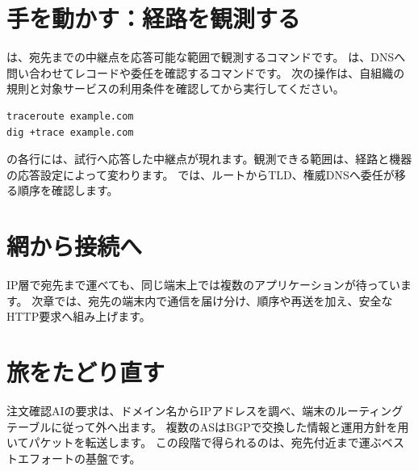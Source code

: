\section{手を動かす：経路を観測する}

は、宛先までの中継点を応答可能な範囲で観測するコマンドです。
は、DNSへ問い合わせてレコードや委任を確認するコマンドです。
次の操作は、自組織の規則と対象サービスの利用条件を確認してから実行してください。

\begin{lstlisting}[language=bash]
traceroute example.com
dig +trace example.com
\end{lstlisting}

の各行には、試行へ応答した中継点が現れます。観測できる範囲は、経路と機器の応答設定によって変わります。
では、ルートからTLD、権威DNSへ委任が移る順序を確認します。

\section{網から接続へ}

IP層で宛先まで運べても、同じ端末上では複数のアプリケーションが待っています。
次章では、宛先の端末内で通信を届け分け、順序や再送を加え、安全なHTTP要求へ組み上げます。

\section{旅をたどり直す}

注文確認AIの要求は、ドメイン名からIPアドレスを調べ、端末のルーティングテーブルに従って外へ出ます。
複数のASはBGPで交換した情報と運用方針を用いてパケットを転送します。
この段階で得られるのは、宛先付近まで運ぶベストエフォートの基盤です。



